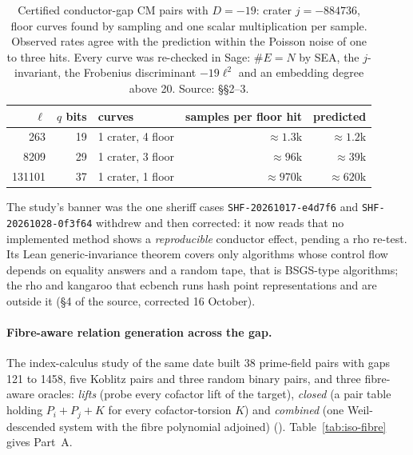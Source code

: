 \begin{table}[t]
\centering\small
\begin{tabular}{@{}rrlrr@{}}
\toprule
$\ell$ & $q$ bits & curves & samples per floor hit & predicted \\
\midrule
263 & 19 & 1 crater, 4 floor & $\approx1.3$k & $\approx1.2$k \\
8209 & 29 & 1 crater, 3 floor & $\approx96$k & $\approx39$k \\
131101 & 37 & 1 crater, 1 floor & $\approx970$k & $\approx620$k \\
\bottomrule
\end{tabular}
\caption[]{Certified conductor-gap CM pairs with $D=-19$: crater $j=-884736$,
floor curves found by sampling and one scalar multiplication per sample.
Observed rates agree with the prediction within the Poisson noise of one to
three hits. Every curve was re-checked in Sage: $\#E=N$ by SEA, the
$j$-invariant, the Frobenius discriminant $-19\ell^2$ and an embedding degree
above 20. Source: 
\S\S2--3.}
\label{tab:iso-gap-pairs}
\end{table} The study's banner was the one sheriff cases
\texttt{SHF-20261017-e4d7f6} and \texttt{SHF-20261028-0f3f64} withdrew and
then corrected: it now reads that no implemented method shows a
\emph{reproducible} conductor effect, pending a rho re-test. Its Lean
generic-invariance theorem covers only algorithms whose control flow depends
on equality answers and a random tape, that is BSGS-type algorithms; the
rho and kangaroo that ecbench runs hash point representations and are
outside it (\S4 of the source, corrected 16 October).

\paragraph{Fibre-aware relation generation across the gap.} The
index-calculus study of the same date built 38 prime-field pairs with gaps
121 to 1458, five Koblitz pairs and three random binary pairs, and three
fibre-aware oracles: \emph{lifts} (probe every cofactor lift of the
target), \emph{closed} (a pair table holding $P_i+P_j+K$ for every
cofactor-torsion $K$) and \emph{combined} (one Weil-descended system with
the fibre polynomial adjoined)
().
Table~\ref{tab:iso-fibre} gives Part~A.

